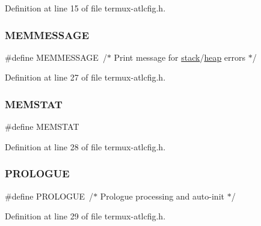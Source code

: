 Definition at line 15 of file termux-\/atlcfig.\+h.

\mbox{\label{termux-atlcfig_8h_a3a12ced9ae9a894dbc0a31282e769d63}} 
\subsubsection{\texorpdfstring{M\+E\+M\+M\+E\+S\+S\+A\+GE}{MEMMESSAGE}}
{\footnotesize\ttfamily \#define M\+E\+M\+M\+E\+S\+S\+A\+GE~/$\ast$ Print message for \hyperlink{FreeRTOS_2atlast_8c_a119bff668c1f986f35cdc8a167c756bb}{stack}/\hyperlink{FreeRTOS_2atlast_8c_a631c4c438b300c6392fe526a50a041c3}{heap} errors $\ast$/}



Definition at line 27 of file termux-\/atlcfig.\+h.

\mbox{\label{termux-atlcfig_8h_a90dbf4dc4f15c07ffcf27e0b757187a7}} 
\subsubsection{\texorpdfstring{M\+E\+M\+S\+T\+AT}{MEMSTAT}}
{\footnotesize\ttfamily \#define M\+E\+M\+S\+T\+AT}



Definition at line 28 of file termux-\/atlcfig.\+h.

\mbox{\label{termux-atlcfig_8h_a59f8a4119207355f67b920d35ec6cc8e}} 
\subsubsection{\texorpdfstring{P\+R\+O\+L\+O\+G\+UE}{PROLOGUE}}
{\footnotesize\ttfamily \#define P\+R\+O\+L\+O\+G\+UE~/$\ast$ Prologue processing and auto-\/init $\ast$/}



Definition at line 29 of file termux-\/atlcfig.\+h.

